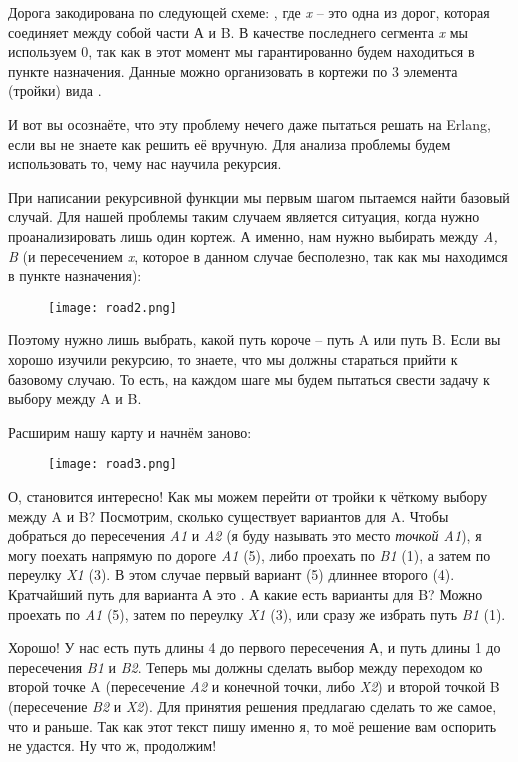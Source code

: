 Дорога закодирована по следующей схеме: , где \emph{x} \--- это одна из дорог, которая соединяет между собой части А и B.
В качестве последнего сегмента \emph{x} мы используем 0, так как в этот момент мы гарантированно будем находиться в пункте назначения.
Данные можно организовать в кортежи по 3 элемента (тройки) вида .

И вот вы осознаёте, что эту проблему нечего даже пытаться решать на Erlang, если вы не знаете как решить её вручную.
Для анализа проблемы будем использовать то, чему нас научила рекурсия.

При написании рекурсивной функции мы первым шагом пытаемся найти базовый случай.
Для нашей проблемы таким случаем является ситуация, когда нужно проанализировать лишь один кортеж.
А именно, нам нужно выбирать между \emph{A, B} (и пересечением \emph{x}, которое в данном случае бесполезно, так как мы находимся в пункте назначения):
\begin{figure}[h!]
    \texttt{[image: road2.png]}
\end{figure}

Поэтому нужно лишь выбрать, какой путь короче \--- путь A или путь B.
Если вы хорошо изучили рекурсию, то знаете, что мы должны стараться прийти к базовому случаю.
То есть, на каждом шаге мы будем пытаться свести задачу к выбору между A и B.

Расширим нашу карту и начнём заново:
\begin{figure}[h!]
    \texttt{[image: road3.png]}
\end{figure}

О, становится интересно!
Как мы можем перейти от тройки  к чёткому выбору между A и B?
Посмотрим, сколько существует вариантов для A.
Чтобы добраться до пересечения \emph{A1} и \emph{A2} (я буду называть это место \emph{точкой A1}), я могу поехать напрямую по дороге \emph{A1} (5), либо проехать по \emph{B1} (1), а затем по переулку \emph{X1} (3).
В этом случае первый вариант (5) длиннее второго (4).
Кратчайший путь для варианта А это \ops{[B, X]}.
А какие есть варианты для B?
Можно проехать по \emph{A1} (5), затем по переулку \emph{X1} (3), или сразу же избрать путь \emph{B1} (1).

Хорошо!
У нас есть путь длины 4 \ops{[B, X]} до первого пересечения А, и путь длины 1 \ops{[B]} до пересечения \emph{B1} и \emph{B2}.
Теперь мы должны сделать выбор между переходом ко второй точке A (пересечение \emph{A2} и конечной точки, либо \emph{X2}) и второй точкой B (пересечение \emph{B2} и \emph{X2}).
Для принятия решения предлагаю сделать то же самое, что и раньше.
Так как этот текст пишу именно я, то моё решение вам оспорить не удастся.
Ну что ж, продолжим!

